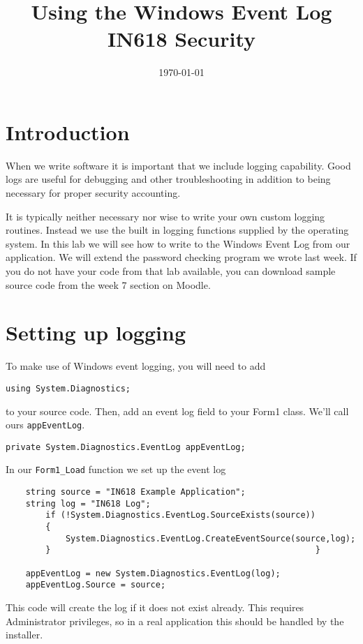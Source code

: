 \documentclass{article}
\begin{document}
\title{ Using the Windows Event Log\\ IN618 Security}
\date{\today}
\maketitle

\section*{Introduction}
When we write software it is important that we include logging capability.  Good logs are useful 
for debugging and other troubleshooting in addition to being necessary for proper security accounting.

It is typically neither necessary nor wise to write your own custom logging routines.  Instead we use
the built in logging functions supplied by the operating system.  In this lab we will see how to write
to the Windows Event Log from our application.  We will extend the password checking program we wrote last week.  If you do not have your code from that lab available, you can download sample source code from the week 7 section on Moodle.

\section{Setting up logging}
To make use of Windows event logging, you will need to add

\texttt{using System.Diagnostics;}

to your source code.  Then, add an event log field to your Form1 class.  We'll call ours 
\texttt{appEventLog}.

\texttt{private  System.Diagnostics.EventLog appEventLog;}

In our \texttt{Form1\_Load} function we set up the event log 

\begin{verbatim}
    string source = "IN618 Example Application";
    string log = "IN618 Log";
        if (!System.Diagnostics.EventLog.SourceExists(source))
        {
            System.Diagnostics.EventLog.CreateEventSource(source,log);
        }								                      }

    appEventLog = new System.Diagnostics.EventLog(log);
    appEventLog.Source = source;
\end{verbatim}

This code will create the log if it does not exist already.  This requires Administrator privileges,
so in a real application this should be handled by the installer.
\end{document}
